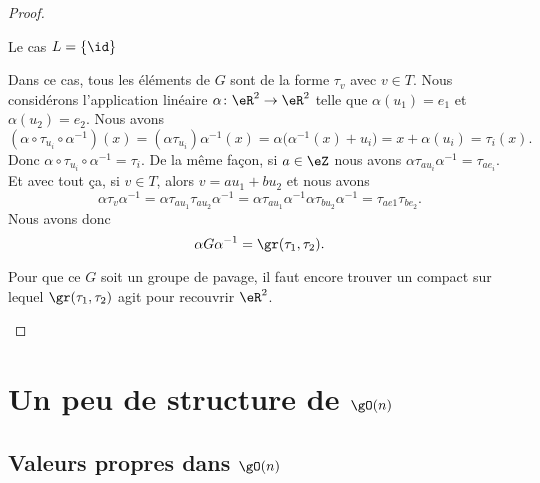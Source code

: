 \begin{proof}
\begin{subproof}
            \item[Le cas \( L=\{ \id \}\)]

                Dans ce cas, tous les éléments de \( G\) sont de la forme \( \tau_v\) avec \( v\in T\). Nous considérons l'application linéaire \( \alpha\colon \eR^2\to \eR^2\) telle que \( \alpha(u_1)=e_1\) et \( \alpha(u_2)=e_2\). Nous avons
                \begin{equation}
                    (\alpha\circ \tau_{u_i}\circ \alpha^{-1})(x)=(\alpha\tau_{u_i})\alpha^{-1}(x)=\alpha\big( \alpha^{-1}(x)+u_i \big)=x+\alpha(u_i)=\tau_i(x).
                \end{equation}
                Donc \( \alpha\circ \tau_{u_i}\circ \alpha^{-1}=\tau_i\). De la même façon, si \( a\in \eZ\) nous avons \( \alpha\tau_{au_i}\alpha^{-1}=\tau_{ae_i}\). Et avec tout ça, si \( v\in T\), alors \( v=au_1+bu_2\) et nous avons
                \begin{equation}
                    \alpha\tau_v\alpha^{-1}=\alpha\tau_{au_1}\tau_{au_2}\alpha^{-1}=\alpha\tau_{au_1}\alpha^{-1}\alpha\tau_{bu_2}\alpha^{-1}=\tau_{ae1}\tau_{be_2}.
                \end{equation}
                Nous avons donc
                \begin{equation}
                    \alpha G\alpha^{-1}=\gr(\tau_1,\tau_2).
                \end{equation}
                
                Pour que ce \( G\) soit un groupe de pavage, il faut encore trouver un compact sur lequel \( \gr(\tau_1,\tau_2)\) agit pour recouvrir \( \eR^2\).

    \end{subproof}
\end{proof}

\section{Un peu de structure de \texorpdfstring{\( \gO(n)\)}{O(n)}}

\subsection{Valeurs propres dans \( \gO(n)\)}

